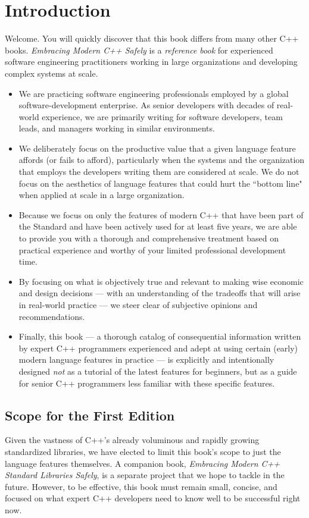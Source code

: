 \setcounter{chapter}{-1}
\chapter[Introduction]{Introduction}\label{ch-intro}


Welcome. You will quickly discover that this book differs from many other C++ books. \textit{Embracing Modern C++ Safely} is a \textit{reference book} for experienced software engineering practitioners working in large organizations and developing complex systems at scale.
\begin{itemize}
\item{We are practicing software engineering professionals employed by a global software-development enterprise. As senior developers with decades of real-world experience, we are primarily writing for software developers, team leads, and managers working in similar environments.}
\item{We deliberately focus on the productive value that a given language feature affords (or fails to afford), particularly when the systems and the organization that employs the developers writing them are considered at scale. We do not focus on the aesthetics of language features that could hurt the ``bottom line" when applied at scale in a large organization.}
\item{Because we focus on only the features of modern C++ that have been part of the Standard and have been actively used for at least five years, we are able to provide you with a thorough and comprehensive treatment based on practical experience and worthy of your limited professional development time.}
\item{By focusing on what is objectively true and relevant to making wise economic and design decisions --- with an understanding of the tradeoffs that will arise in real-world practice --- we steer clear of subjective opinions and recommendations.}
\item{Finally, this book --- a thorough catalog of consequential information written by expert C++ programmers experienced and adept at using certain (early) modern language features in practice --- is explicitly and intentionally designed \textit{not} as a tutorial of the latest features for beginners, but as a guide for senior C++ programmers less familiar with these specific features.}
\end{itemize}

\section[Scope for the First Edition]{Scope for the First Edition}
Given the vastness of C++'s already voluminous and rapidly growing standardized libraries, we have elected to limit this book's scope to just the language features themselves.  A companion book, \textit{Embracing Modern C++ Standard Libraries Safely}, is a separate project that we hope to tackle in the future. However, to be effective, this book must remain small, concise, and focused on what expert C++ developers need to know well to be successful right now.

